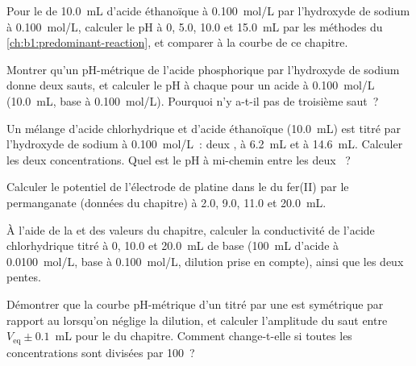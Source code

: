 \begin{exercise}[$\star\star$]\label{exo:b1:titration-methods:5}
Pour le  de \qty{10.0}{mL} d'acide éthanoïque à \qty{0.100}{mol/L}
par l'hydroxyde de sodium à \qty{0.100}{mol/L}, calculer le pH à 0, 5.0,
10.0 et \qty{15.0}{mL} par les méthodes du
\cref{ch:b1:predominant-reaction}, et comparer à la courbe de ce
chapitre.
\end{exercise}

\begin{exercise}[$\star\star$]\label{exo:b1:titration-methods:6}
Montrer qu'un  pH-métrique de l'acide phosphorique par
l'hydroxyde de sodium donne deux sauts, et calculer le pH à chaque
 pour un acide à \qty{0.100}{mol/L} (\qty{10.0}{mL}, base à
\qty{0.100}{mol/L}). Pourquoi n'y a-t-il pas de troisième saut~?
\end{exercise}

\begin{exercise}[$\star\star$]\label{exo:b1:titration-methods:7}
Un mélange d'acide chlorhydrique et d'acide éthanoïque (\qty{10.0}{mL})
est titré par l'hydroxyde de sodium à \qty{0.100}{mol/L}~: deux
, à \qty{6.2}{mL} et à \qty{14.6}{mL}. Calculer les deux
concentrations. Quel est le pH à mi-chemin entre les deux
~?
\end{exercise}

\begin{exercise}[$\star\star$]\label{exo:b1:titration-methods:8}
Calculer le potentiel de l'électrode de platine dans le  du
fer(II) par le permanganate (données du chapitre) à 2.0, 9.0, 11.0 et
\qty{20.0}{mL}.
\end{exercise}

\begin{exercise}[$\star\star$]\label{exo:b1:titration-methods:9}
À l'aide de la  et des valeurs du chapitre, calculer la
conductivité de l'acide chlorhydrique titré à 0, 10.0 et
\qty{20.0}{mL} de base (\qty{100}{mL} d'acide à \qty{0.0100}{mol/L},
base à \qty{0.100}{mol/L}, dilution prise en compte), ainsi que les deux
pentes.
\end{exercise}

\begin{exercise}[$\star\star\star$]\label{exo:b1:titration-methods:10}
Démontrer que la courbe pH-métrique d'un  titré par une  est symétrique par rapport au  lorsqu'on
néglige la dilution, et calculer l'amplitude du saut entre
$V_{\mathrm{eq}} \pm 0.1$~mL
pour le  du chapitre. Comment change-t-elle si toutes les
concentrations sont divisées par 100~?
\end{exercise}

